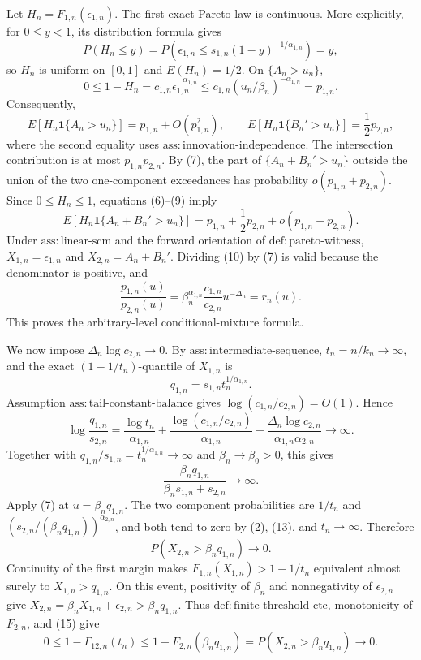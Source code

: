 Let \(H_n=F_{1,n}(\epsilon_{1,n})\). The first exact-Pareto law is continuous. More explicitly, for \(0\leq y<1\), its distribution formula gives
\[
P(H_n\leq y)
=P\!\left(\epsilon_{1,n}\leq s_{1,n}(1-y)^{-1/\alpha_{1,n}}\right)=y,
\]
so \(H_n\) is uniform on \([0,1]\) and \(E(H_n)=1/2\). On \(\{A_n>u_n\}\),
\[
0\leq1-H_n=c_{1,n}\epsilon_{1,n}^{-\alpha_{1,n}}
\leq c_{1,n}(u_n/\beta_n)^{-\alpha_{1,n}}=p_{1,n}.
\tag{8}
\]
Consequently,
\[
E[H_n\mathbf1\{A_n>u_n\}]=p_{1,n}+O(p_{1,n}^2),
\qquad
E[H_n\mathbf1\{B_n'>u_n\}]=\frac12p_{2,n},
\tag{9}
\]
where the second equality uses \(\mathrm{ass{:}innovation\text{-}independence}\). The intersection contribution is at most \(p_{1,n}p_{2,n}\). By (7), the part of \(\{A_n+B_n'>u_n\}\) outside the union of the two one-component exceedances has probability \(o(p_{1,n}+p_{2,n})\). Since \(0\leq H_n\leq1\), equations (6)--(9) imply
\[
E[H_n\mathbf1\{A_n+B_n'>u_n\}]
=p_{1,n}+\frac12p_{2,n}+o(p_{1,n}+p_{2,n}).
\tag{10}
\]
Under \(\mathrm{ass{:}linear\text{-}scm}\) and the forward orientation of \(\mathrm{def{:}pareto\text{-}witness}\), \(X_{1,n}=\epsilon_{1,n}\) and \(X_{2,n}=A_n+B_n'\). Dividing (10) by (7) is valid because the denominator is positive, and
\[
\frac{p_{1,n}(u)}{p_{2,n}(u)}
=\beta_n^{\alpha_{1,n}}\frac{c_{1,n}}{c_{2,n}}u^{-\Delta_n}=r_n(u).
\tag{11}
\]
This proves the arbitrary-level conditional-mixture formula.

We now impose \(\Delta_n\log c_{2,n}\to0\). By \(\mathrm{ass{:}intermediate\text{-}sequence}\), \(t_n=n/k_n\to\infty\), and the exact \((1-1/t_n)\)-quantile of \(X_{1,n}\) is
\[
q_{1,n}=s_{1,n}t_n^{1/\alpha_{1,n}}.
\tag{12}
\]
Assumption \(\mathrm{ass{:}tail\text{-}constant\text{-}balance}\) gives \(\log(c_{1,n}/c_{2,n})=O(1)\). Hence
\[
\log\frac{q_{1,n}}{s_{2,n}}
=\frac{\log t_n}{\alpha_{1,n}}
+\frac{\log(c_{1,n}/c_{2,n})}{\alpha_{1,n}}
-\frac{\Delta_n\log c_{2,n}}{\alpha_{1,n}\alpha_{2,n}}
\longrightarrow\infty.
\tag{13}
\]
Together with \(q_{1,n}/s_{1,n}=t_n^{1/\alpha_{1,n}}\to\infty\) and \(\beta_n\to\beta_0>0\), this gives
\[
\frac{\beta_nq_{1,n}}{\beta_ns_{1,n}+s_{2,n}}\to\infty.
\tag{14}
\]
Apply (7) at \(u=\beta_nq_{1,n}\). The two component probabilities are \(1/t_n\) and \((s_{2,n}/(\beta_nq_{1,n}))^{\alpha_{2,n}}\), and both tend to zero by (2), (13), and \(t_n\to\infty\). Therefore
\[
P(X_{2,n}>\beta_nq_{1,n})\to0.
\tag{15}
\]
Continuity of the first margin makes \(F_{1,n}(X_{1,n})>1-1/t_n\) equivalent almost surely to \(X_{1,n}>q_{1,n}\). On this event, positivity of \(\beta_n\) and nonnegativity of \(\epsilon_{2,n}\) give \(X_{2,n}=\beta_nX_{1,n}+\epsilon_{2,n}>\beta_nq_{1,n}\). Thus \(\mathrm{def{:}finite\text{-}threshold\text{-}ctc}\), monotonicity of \(F_{2,n}\), and (15) give
\[
0\leq1-\Gamma_{12,n}(t_n)
\leq1-F_{2,n}(\beta_nq_{1,n})
=P(X_{2,n}>\beta_nq_{1,n})\to0.
\tag{16}
\]

